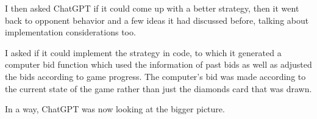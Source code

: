\documentclass{article}
\begin{document}
I then asked ChatGPT if it could come up with a better strategy, then it went back to opponent behavior and a few ideas it had discussed before, talking about implementation considerations too.

I asked if it could implement the strategy in code, to which it generated a computer bid function which used the information of past bids as well as adjusted the bids according to game progress. The computer's bid was made according to the current state of the game rather than just the diamonds card that was drawn. 

In a way, ChatGPT was now looking at the bigger picture.
\end{document}
